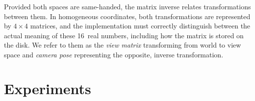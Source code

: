 Provided both spaces are same-handed, the matrix inverse relates transformations between
them. In homogeneous coordinates, both transformations are represented by $4\times4$
matrices, and the implementation must correctly distinguish between the actual meaning of
these 16~real numbers, including how the matrix is stored on the disk. We refer to them as
the \emph{view matrix} transforming from world to view space and \emph{camera pose}
representing the opposite, inverse transformation.





\section{Experiments} %

